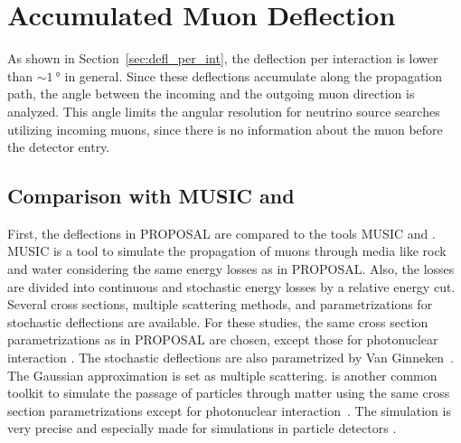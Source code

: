 \section{Accumulated Muon Deflection}\label{sec:accum_defl}

As shown in Section~\ref{sec:defl_per_int}, the deflection per interaction 
is lower than $\sim\SI{1}{\degree}$ in general. Since these deflections accumulate along the 
propagation path, the angle between the incoming and the outgoing 
muon direction is analyzed. This angle limits the angular resolution 
for neutrino source searches utilizing incoming muons, since there is no information 
about the muon before the detector entry.

\subsection{Comparison with MUSIC and }
First, the deflections in PROPOSAL are compared to 
the tools MUSIC  and  .
MUSIC is a tool to simulate the propagation of muons 
through media like rock and water considering the same energy losses as in 
PROPOSAL. Also, the losses are divided into continuous and stochastic 
energy losses by a relative energy cut. Several cross sections, multiple scattering 
methods, and parametrizations for stochastic deflections are 
available. For these studies, the same cross section parametrizations 
as in PROPOSAL are chosen, except those for 
photonuclear interaction \cite{nulcint_bugaev_Shlepin, bugaev_1980_defl,bugaev_1981_defl}. The stochastic deflections are also parametrized by 
Van Ginneken~\cite{Van_Ginneken}. 
The Gaussian 
approximation \cite{HIGHLAND_1975} is set as multiple scattering. 
 is another common toolkit to simulate the passage of particles through 
matter using the same cross section parametrizations except for photonuclear interaction~\cite{Borog:1975_inelastic}. The simulation is very precise and especially 
made for simulations in particle detectors  . 

